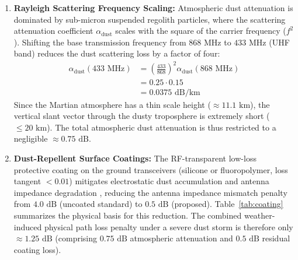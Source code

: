 \documentclass{ijuc}
\begin{document}
\begin{enumerate}
    \item \textbf{Rayleigh Scattering Frequency Scaling:} Atmospheric dust attenuation is dominated by sub-micron suspended regolith particles, where the scattering attenuation coefficient $\alpha_{\text{dust}}$ scales with the square of the carrier frequency ($f^2$). Shifting the base transmission frequency from $868\text{ MHz}$ to $433\text{ MHz}$ (UHF band) reduces the dust scattering loss by a factor of four:
    \begin{equation}
    \begin{split}
        \alpha_{\text{dust}}(433\text{ MHz}) &= \left(\frac{433}{868}\right)^2 \alpha_{\text{dust}}(868\text{ MHz}) \\
        &= 0.25 \cdot 0.15 \\
        &= 0.0375\text{ dB/km}
    \end{split}
    \end{equation}
    Since the Martian atmosphere has a thin scale height ($\approx 11.1\text{ km}$), the vertical slant vector through the dusty troposphere is extremely short ($\leq 20\text{ km}$). The total atmospheric dust attenuation is thus restricted to a negligible $\approx 0.75\text{ dB}$.
    \item \textbf{Dust-Repellent Surface Coatings:} The RF-transparent low-loss protective coating on the ground transceivers (silicone or fluoropolymer, loss tangent $< 0.01$) mitigates electrostatic dust accumulation and antenna impedance degradation \cite{calle2011active, afshar2015review}, reducing the antenna impedance mismatch penalty from $4.0\text{ dB}$ (uncoated standard) to $0.5\text{ dB}$ (proposed). Table~\ref{tab:coating} summarizes the physical basis for this reduction. The combined weather-induced physical path loss penalty under a severe dust storm is therefore only $\approx 1.25\text{ dB}$ (comprising $0.75\text{ dB}$ atmospheric attenuation and $0.5\text{ dB}$ residual coating loss).


\end{enumerate}
\end{document}

